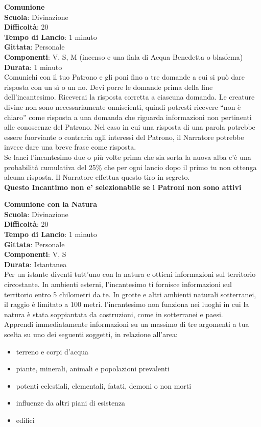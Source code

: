 \begin{multicols}{2}
\medskip\textbf{Comunione}\\
\textbf{Scuola}: Divinazione\\
\textbf{Difficoltà}:  20\\
\textbf{Tempo di Lancio}: 1 minuto\\
\textbf{Gittata}: Personale\\
\textbf{Componenti}: V, S, M (incenso e una fiala di Acqua Benedetta o blasfema)\\
\textbf{Durata}: 1 minuto\\
Comunichi con il tuo Patrono e gli poni fino a tre domande a cui si può dare risposta con un sì o un no. Devi porre le domande prima della fine dell'incantesimo. Riceverai la risposta corretta a ciascuna domanda. Le creature divine non sono necessariamente onniscienti, quindi potresti ricevere “non è chiaro” come risposta a una domanda che riguarda informazioni non pertinenti alle conoscenze del Patrono. Nel caso in cui una risposta di una parola potrebbe essere fuorviante o contraria agli interessi del Patrono, il Narratore potrebbe invece dare una breve frase come risposta.\\
Se lanci l'incantesimo due o più volte prima che sia sorta la nuova alba c’è una probabilità cumulativa del 25\% che per ogni lancio dopo il primo tu non ottenga alcuna risposta. Il Narratore effettua questo tiro in segreto.\\
\textbf{Questo Incantimo non e' selezionabile se i Patroni non sono attivi}

\medskip\textbf{Comunione con la Natura}\\
\textbf{Scuola}: Divinazione\\
\textbf{Difficoltà}:  20\\
\textbf{Tempo di Lancio}: 1 minuto\\
\textbf{Gittata}: Personale\\
\textbf{Componenti}: V, S\\
\textbf{Durata}: Istantanea\\
Per un istante diventi tutt’uno con la natura e ottieni informazioni sul territorio circostante. In ambienti esterni, l'incantesimo ti fornisce informazioni sul territorio entro 5 chilometri da te. In grotte e altri  ambienti naturali sotterranei, il raggio è limitato a 100 metri. l'incantesimo non funziona nei luoghi in cui la natura è stata soppiantata da costruzioni, come in sotterranei e paesi.\\
Apprendi immediatamente informazioni su un massimo di tre argomenti a tua scelta su uno dei seguenti soggetti, in relazione all'area:
\begin{itemize}
	\item 
	terreno e corpi d’acqua
	\item 
	piante, minerali, animali e popolazioni prevalenti
	\item 
    potenti celestiali, elementali, fatati, demoni o non morti
	\item 
    influenze da altri piani di esistenza
	\item
    edifici
\end{itemize}


\end{multicols}
